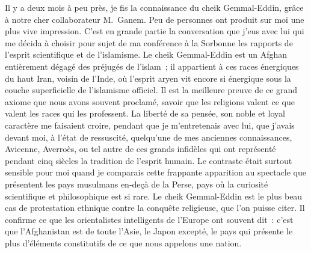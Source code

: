 \documentclass[french,twoside]{book} %
\newcommand\orgName[1]{#1}
\newcommand\persName[1]{#1}
\newcommand\placeName[1]{#1}
\begin{document}
Il y a deux mois à peu près, je fis la connaissance du {\persName cheik Gemmal-Eddin}, grâce à notre cher collaborateur {\persName M. Ganem}. Peu de personnes ont produit sur moi une plus vive impression. C’est en grande partie la conversation que j’eus avec lui qui me décida à choisir pour sujet de ma conférence à la {\placeName Sorbonne} les rapports de l’esprit scientifique et de l’islamisme. Le {\persName cheik Gemmal-Eddin} est un Afghan entièrement dégagé des préjugés de l’islam ; il appartient à ces races énergiques du {\placeName haut Iran}, voisin de l’{\placeName Inde}, où l’esprit aryen vit encore si énergique sous la couche superficielle de l’islamisme officiel. Il est la meilleure preuve de ce grand axiome que nous avons souvent proclamé, savoir que les religions valent ce que valent les races qui les professent. La liberté de sa pensée, son noble et loyal caractère me faisaient croire, pendant que je m’entretenais avec lui, que j’avais devant moi, à l’état de ressuscité, quelqu’une de mes anciennes connaissances, {\persName Avicenne}, {\persName Averroès}, ou tel autre de ces grands infidèles qui ont représenté pendant cinq siècles la tradition de l’esprit humain. Le contraste était surtout sensible pour moi quand je comparais cette frappante apparition au spectacle que présentent les pays musulmans en-deçà de la {\placeName Perse}, pays où la curiosité scientifique et philosophique est si rare. Le {\persName cheik Gemmal-Eddin} est le plus beau cas de protestation ethnique contre la conquête religieuse, que l’on puisse citer. Il confirme ce que les orientalistes intelligents de l’Europe ont souvent dit : c’est que l’{\orgName Afghanistan} est de toute l’{\placeName Asie}, le {\placeName Japon} excepté, le pays qui présente le plus d’éléments constitutifs de ce que nous appelons une nation.\par
\end{document}
